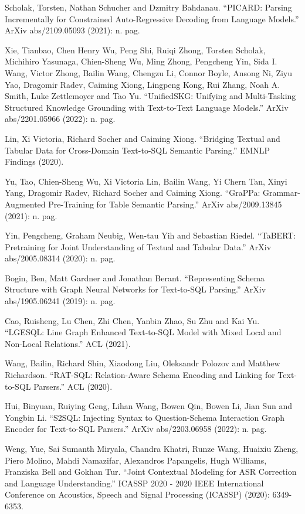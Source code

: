 \documentclass[11pt,dvipdfm]{article}
\begin{document}
\begin{thebibliography}{10}
\begin{small}
 Scholak, Torsten, Nathan Schucher and Dzmitry Bahdanau. “PICARD: Parsing Incrementally for Constrained Auto-Regressive Decoding from Language Models.” ArXiv abs/2109.05093 (2021): n. pag.

 Xie, Tianbao, Chen Henry Wu, Peng Shi, Ruiqi Zhong, Torsten Scholak, Michihiro Yasunaga, Chien-Sheng Wu, Ming Zhong, Pengcheng Yin, Sida I. Wang, Victor Zhong, Bailin Wang, Chengzu Li, Connor Boyle, Ansong Ni, Ziyu Yao, Dragomir Radev, Caiming Xiong, Lingpeng Kong, Rui Zhang, Noah A. Smith, Luke Zettlemoyer and Tao Yu. “UnifiedSKG: Unifying and Multi-Tasking Structured Knowledge Grounding with Text-to-Text Language Models.” ArXiv abs/2201.05966 (2022): n. pag.

 Lin, Xi Victoria, Richard Socher and Caiming Xiong. “Bridging Textual and Tabular Data for Cross-Domain Text-to-SQL Semantic Parsing.” EMNLP Findings (2020).

 Yu, Tao, Chien-Sheng Wu, Xi Victoria Lin, Bailin Wang, Yi Chern Tan, Xinyi Yang, Dragomir Radev, Richard Socher and Caiming Xiong. “GraPPa: Grammar-Augmented Pre-Training for Table Semantic Parsing.” ArXiv abs/2009.13845 (2021): n. pag.

 Yin, Pengcheng, Graham Neubig, Wen-tau Yih and Sebastian Riedel. “TaBERT: Pretraining for Joint Understanding of Textual and Tabular Data.” ArXiv abs/2005.08314 (2020): n. pag.

 Bogin, Ben, Matt Gardner and Jonathan Berant. “Representing Schema Structure with Graph Neural Networks for Text-to-SQL Parsing.” ArXiv abs/1905.06241 (2019): n. pag.

 Cao, Ruisheng, Lu Chen, Zhi Chen, Yanbin Zhao, Su Zhu and Kai Yu. “LGESQL: Line Graph Enhanced Text-to-SQL Model with Mixed Local and Non-Local Relations.” ACL (2021).

 Wang, Bailin, Richard Shin, Xiaodong Liu, Oleksandr Polozov and Matthew Richardson. “RAT-SQL: Relation-Aware Schema Encoding and Linking for Text-to-SQL Parsers.” ACL (2020).

 Hui, Binyuan, Ruiying Geng, Lihan Wang, Bowen Qin, Bowen Li, Jian Sun and Yongbin Li. “S2SQL: Injecting Syntax to Question-Schema Interaction Graph Encoder for Text-to-SQL Parsers.” ArXiv abs/2203.06958 (2022): n. pag.

 Weng, Yue, Sai Sumanth Miryala, Chandra Khatri, Runze Wang, Huaixiu Zheng, Piero Molino, Mahdi Namazifar, Alexandros Papangelis, Hugh Williams, Franziska Bell and Gokhan Tur. “Joint Contextual Modeling for ASR Correction and Language Understanding.” ICASSP 2020 - 2020 IEEE International Conference on Acoustics, Speech and Signal Processing (ICASSP) (2020): 6349-6353.


\end{small}
\end{thebibliography}
\end{document}
